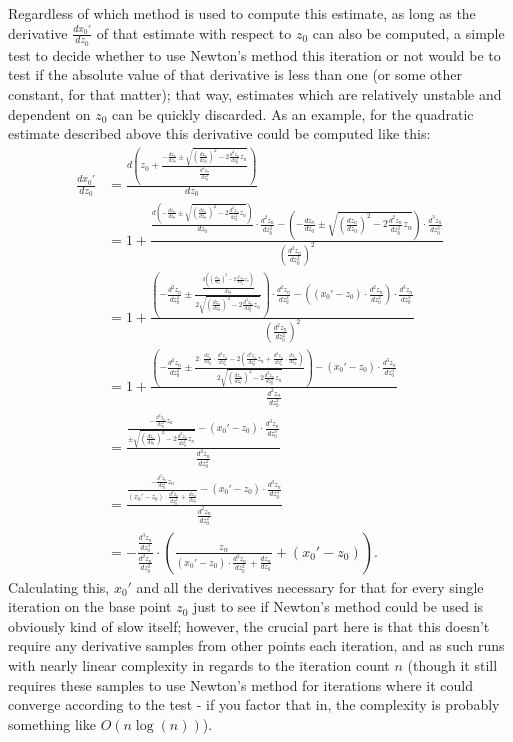 \documentclass[12pt,a4paper]{article}
\newcommand{\eqar}[1]{\begin{align*} #1 \end{align*}}
\begin{document}
Regardless of which method is used to compute this estimate, as long as the derivative $\frac{dx_0'}{dz_0}$ of that estimate with respect to $z_0$ can also be computed, a simple test to decide whether to use Newton's method this iteration or not would be to test if the absolute value of that derivative is less than one (or some other constant, for that matter); that way, estimates which are relatively unstable and dependent on $z_0$ can be quickly discarded. As an example, for the quadratic estimate described above this derivative could be computed like this:
\eqar{
	\frac{dx_0'}{dz_0} &= \frac{d\left(z_0+\frac{-\frac{dz_n}{dz_0}\pm\sqrt{(\frac{dz_n}{dz_0})^2-2\frac{d^2z_n}{dz_0^2}z_n}}{\frac{d^2z_n}{dz_0^2}}\right)}{dz_0}\\
	&= 1+\frac{\frac{d\left(-\frac{dz_n}{dz_0}\pm\sqrt{(\frac{dz_n}{dz_0})^2-2\frac{d^2z_n}{dz_0^2}z_n}\right)}{dz_0}\cdot\frac{d^2z_n}{dz_0^2}-\left(-\frac{dz_n}{dz_0}\pm\sqrt{(\frac{dz_n}{dz_0})^2-2\frac{d^2z_n}{dz_0^2}z_n}\right)\cdot\frac{d^3z_n}{dz_0^3}}{(\frac{d^2z_n}{dz_0^2})^2}\\
	&= 1+\frac{\left(-\frac{d^2z_n}{dz_0^2}\pm\frac{\frac{d((\frac{dz_n}{dz_0})^2-2\frac{d^2z_n}{dz_0^2}z_n)}{dz_0}}{2\sqrt{(\frac{dz_n}{dz_0})^2-2\frac{d^2z_n}{dz_0^2}z_n}}\right)\cdot\frac{d^2z_n}{dz_0^2}-((x_0'-z_0)\cdot\frac{d^2z_n}{dz_0^2})\cdot\frac{d^3z_n}{dz_0^3}}{(\frac{d^2z_n}{dz_0^2})^2}\\
	&= 1+\frac{\left(-\frac{d^2z_n}{dz_0^2}\pm\frac{2\cdot\frac{dz_n}{dz_0}\cdot\frac{d^2z_n}{dz_0^2}-2(\frac{d^3z_n}{dz_0^3}z_n+\frac{d^2z_n}{dz_0^2}\cdot\frac{dz_n}{dz_0})}{2\sqrt{(\frac{dz_n}{dz_0})^2-2\frac{d^2z_n}{dz_0^2}z_n}}\right)-(x_0'-z_0)\cdot\frac{d^3z_n}{dz_0^3}}{\frac{d^2z_n}{dz_0^2}}\\
	&= \frac{\frac{-\frac{d^3z_n}{dz_0^3}z_n}{\pm\sqrt{(\frac{dz_n}{dz_0})^2-2\frac{d^2z_n}{dz_0^2}z_n}}-(x_0'-z_0)\cdot\frac{d^3z_n}{dz_0^3}}{\frac{d^2z_n}{dz_0^2}}\\
	&= \frac{\frac{-\frac{d^3z_n}{dz_0^3}z_n}{(x_0'-z_0)\cdot\frac{d^2z_n}{dz_0^2}+\frac{dz_n}{dz_0}}-(x_0'-z_0)\cdot\frac{d^3z_n}{dz_0^3}}{\frac{d^2z_n}{dz_0^2}}\\
	&= -\frac{\frac{d^3z_n}{dz_0^3}}{\frac{d^2z_n}{dz_0^2}}\cdot\left(\frac{z_n}{(x_0'-z_0)\cdot\frac{d^2z_n}{dz_0^2}+\frac{dz_n}{dz_0}}+(x_0'-z_0)\right).
}
Calculating this, $x_0'$ and all the derivatives necessary for that for every single iteration on the base point $z_0$ just to see if Newton's method could be used is obviously kind of slow itself; however, the crucial part here is that this doesn't require any derivative samples from other points each iteration, and as such runs with nearly linear complexity in regards to the iteration count $n$ (though it still requires these samples to use Newton's method for iterations where it could converge according to the test - if you factor that in, the complexity is probably something like $O(n\log(n))$).
\end{document}
